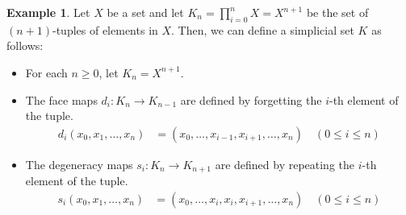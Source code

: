 \documentclass[11pt]{article}
\theoremstyle{definition}
\newtheorem{example}[definition]{Example}
\theoremstyle{plain}
\begin{document}
\begin{example}
    Let $X$ be a set and let $K_n =\prod_{i=0}^n X=X^{n+1}$ be the set of $(n+1)$-tuples of elements in $X$. Then, we can define a simplicial set $K$ as follows:
    \begin{itemize}
        \item For each $n \geq 0$, let $K_n = X^{n+1}$.
        \item The face maps $d_i : K_n \to K_{n-1}$ are defined by forgetting the $i$-th element of the tuple.
              \begin{align*}
                  d_i(x_0, x_1, \ldots, x_n) & = (x_0, \ldots, x_{i-1}, x_{i+1}, \ldots, x_n) \quad (0 \leq i \leq n)
              \end{align*}
        \item The degeneracy maps $s_i : K_n \to K_{n+1}$ are defined by repeating the $i$-th element of the tuple.
              \begin{align*}
                  s_i(x_0, x_1, \ldots, x_n) & = (x_0, \ldots, x_i, x_i, x_{i+1}, \ldots, x_n) \quad (0 \leq i \leq n)
              \end{align*}
    \end{itemize}

\end{example}
\end{document}
